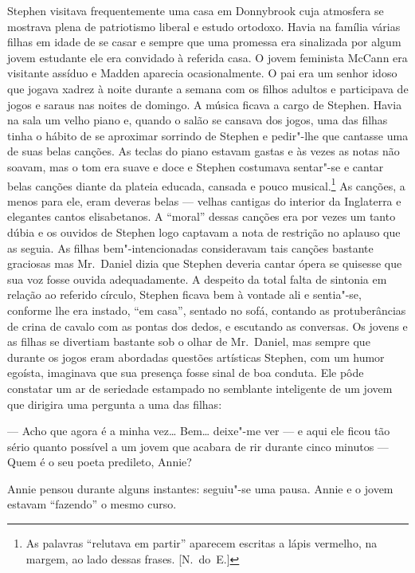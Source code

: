 Stephen visitava frequentemente uma casa em Donnybrook cuja
atmosfera se mostrava plena de patriotismo liberal e estudo ortodoxo.
Havia na família várias filhas em idade de se casar e sempre que uma
promessa era sinalizada por algum jovem estudante ele era convidado à
referida casa.  O jovem feminista McCann era visitante assíduo e Madden
aparecia ocasionalmente.  O pai era um senhor idoso que jogava xadrez à
noite durante a semana com os filhos adultos e participava de jogos e
saraus nas noites de domingo.  A música ficava a cargo de Stephen.
Havia na sala um velho piano e, quando o salão se cansava dos jogos, uma
das filhas tinha o hábito de se aproximar sorrindo de Stephen e
\label{pedir"-lhe"-que} pedir"-lhe que cantasse uma de suas belas canções.  As teclas do piano
estavam gastas e às vezes as notas não soavam, mas o tom era suave e
doce e Stephen costumava sentar"-se e cantar belas canções diante da
plateia educada, cansada e pouco musical.\footnote{ As palavras
“relutava em partir” aparecem escritas a lápis vermelho, na margem, ao
lado dessas frases. [N.~do~E.]}  As canções, a menos para ele, eram		
deveras belas --- velhas cantigas do interior da Inglaterra e elegantes
cantos elisabetanos.  A “moral” dessas canções era por vezes um tanto
dúbia e os ouvidos de Stephen logo captavam a nota de restrição no
aplauso que as seguia.  As filhas bem"-intencionadas consideravam tais
canções bastante graciosas mas Mr.~Daniel dizia que Stephen deveria
cantar ópera se quisesse que sua voz fosse ouvida adequadamente.  A
despeito da total falta de sintonia em relação ao referido círculo,
Stephen ficava bem à vontade ali e sentia"-se, conforme lhe era instado,		
“em casa”, sentado no sofá, contando as protuberâncias de crina de
cavalo com as pontas dos \label{dedos"-e} dedos, e escutando as conversas.  Os jovens
e as filhas se divertiam bastante sob o olhar de Mr.~Daniel, mas sempre
que durante os jogos eram abordadas questões artísticas Stephen, com um
humor egoísta, imaginava que sua presença fosse sinal de boa conduta.
Ele pôde constatar um ar de seriedade estampado no semblante
inteligente de um jovem que dirigira uma pergunta a uma das filhas:

--- Acho que agora é a minha vez\ldots{}  Bem\ldots{} deixe"-me ver --- e aqui
ele ficou tão sério quanto possível a um jovem que acabara de rir
durante cinco minutos --- Quem é o seu poeta predileto, Annie?

Annie pensou durante alguns instantes: seguiu"-se uma pausa.  Annie e
o jovem estavam “fazendo” o mesmo curso.

